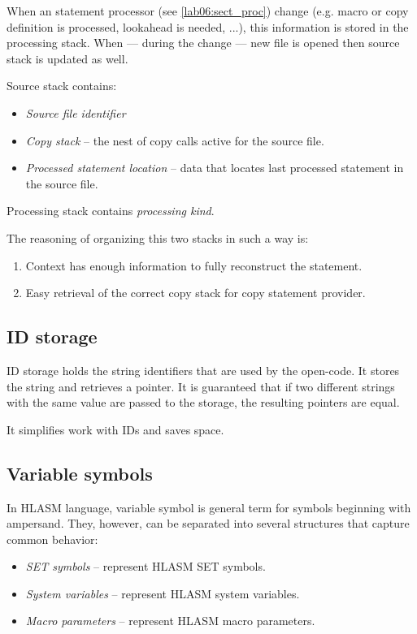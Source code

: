 When an statement processor (see \cref{lab06:sect_proc}) change (e.g. macro or copy definition is processed, lookahead is needed, ...), this information is stored in the processing stack. When --- during the change --- new file is opened then source stack is updated as well.

Source stack contains:
\begin{itemize}
	\item \emph{Source file identifier}
	\item \emph{Copy stack} -- the nest of copy calls active for the source file.
	\item \emph{Processed statement location} -- data that locates last processed statement in the source file.
\end{itemize}
Processing stack contains \emph{processing kind}.

The reasoning of organizing this two stacks in such a way is:
\begin{enumerate}
	\item Context has enough information to fully reconstruct the statement.
	\item Easy retrieval of the correct copy stack for copy statement provider.
\end{enumerate} 

\subsection{ID storage}

ID storage holds the string identifiers that are used by the open-code. 
It stores the string and retrieves a pointer. It is guaranteed that if two different strings with the same value are passed to the storage, the resulting pointers are equal.

It simplifies work with IDs and saves space. 

\subsection{Variable symbols}
\label{lab06:var_sym}

In HLASM language, variable symbol is general term for symbols beginning with ampersand. They, however, can be separated into several structures that capture common behavior:

\begin{itemize}
	\item \emph{SET symbols} -- represent HLASM SET symbols.
	\item \emph{System variables} -- represent HLASM system variables.
	\item \emph{Macro parameters} -- represent HLASM macro parameters.
\end{itemize}


